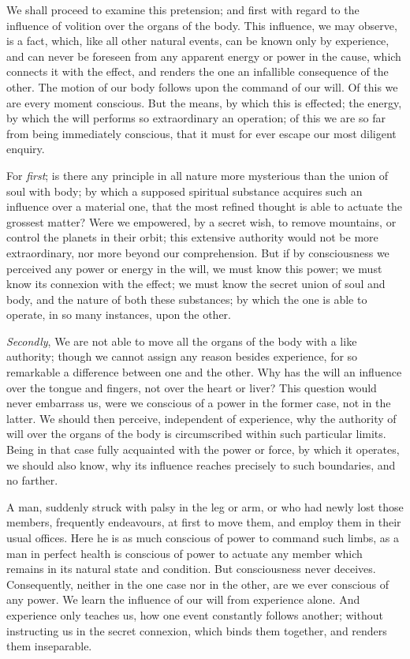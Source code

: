 \documentclass[]{article}
\begin{document}
\begin{sectionbody}
\humeparagraph  We shall proceed to examine this pretension; and first with regard to the influence of volition over the organs of the body. This influence, we may observe, is a fact, which, like all other natural events, can be known only by experience, and can never be foreseen from any apparent energy or power in the cause, which connects it with the effect, and renders the one an infallible consequence of the other. The motion of our body follows upon the command of our will. Of this we are every moment conscious. But the means, by which this is effected; the energy, by which the will performs so extraordinary an operation; of this we are so far from being immediately conscious, that it must for ever escape our most diligent enquiry.

\humeparagraph  For \emph{first}; is there any principle in all nature more mysterious than the union of soul with body; by which a supposed spiritual substance acquires such an influence over a material one, that the most refined thought is able to actuate the grossest matter? Were we empowered, by a secret wish, to remove mountains, or control the planets in their orbit; this extensive authority would not be more extraordinary, nor more beyond our comprehension. But if by consciousness we perceived any power or energy in the will, we must know this power; we must know its connexion with the effect; we must know the secret union of soul and body, and the nature of both these substances; by which the one is able to operate, in so many instances, upon the other.

\humeparagraph  \emph{Secondly}, We are not able to move all the organs of the body with a like authority; though we cannot assign any reason besides experience, for so remarkable a difference between one and the other. Why has the will an influence over the tongue and fingers, not over the heart or liver? This question would never embarrass us, were we conscious of a power in the former case, not in the latter. We should then perceive, independent of experience, why the authority of will over the organs of the body is circumscribed within such particular limits. Being in that case fully acquainted with the power or force, by which it operates, we should also know, why its influence reaches precisely to such boundaries, and no farther.

\humeparagraph  A man, suddenly struck with palsy in the leg or arm, or who had newly lost those members, frequently endeavours, at first to move them, and employ them in their usual offices. Here he is as much conscious of power to command such limbs, as a man in perfect health is conscious of power to actuate any member which remains in its natural state and condition. But consciousness never deceives. Consequently, neither in the one case nor in the other, are we ever conscious of any power. We learn the influence of our will from experience alone. And experience only teaches us, how one event constantly follows another; without instructing us in the secret connexion, which binds them together, and renders them inseparable.


\end{sectionbody}
\end{document}
